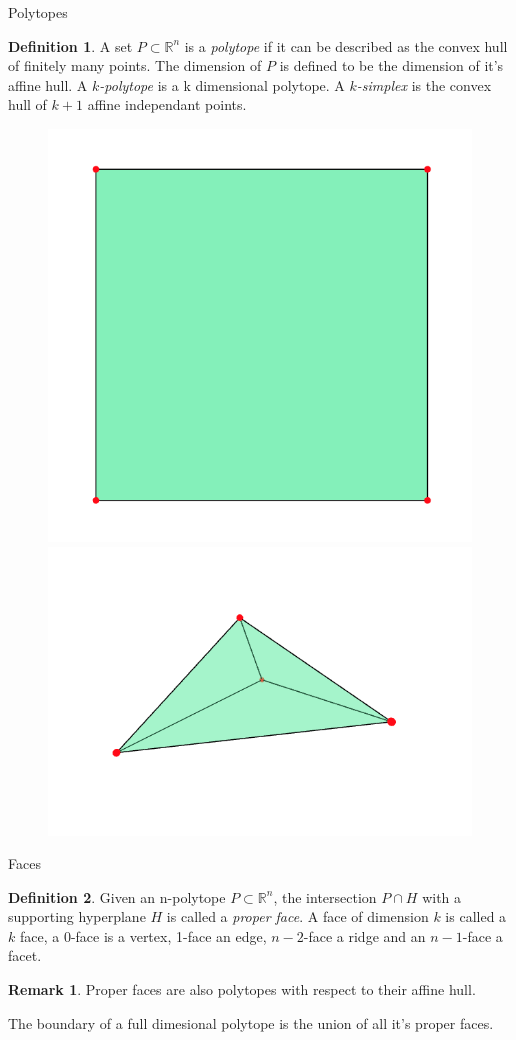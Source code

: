 \documentclass[9pt]{beamer}
\theoremstyle{definition}
\newtheorem{remark}{Remark}
\newtheorem{defn}{Definition}
\begin{document}
\begin{frame}[fragile]{Polytopes}
  \begin{defn}
    A set $P \subset \mathbb{R}^n$ is a \emph{polytope} if it can be described
    as the convex hull of finitely many points. The dimension of $P$ is
    defined to be the dimension of it's affine hull. A \emph{$k$-polytope} is a
    k dimensional polytope. A \emph{$k$-simplex} is the convex hull of $k + 1$
    affine independant points.
  \end{defn}

  \begin{figure}
    \includegraphics[width=.30\textwidth, height=0.4\textheight]{images/square}
    \includegraphics[width=.30\textwidth, height=0.4\textheight]{images/simplex}
  \end{figure}

\end{frame}


\begin{frame}[fragile]{Faces}
  \begin{defn}
    Given an n-polytope $P \subset \mathbb{R}^n$, the intersection $P \cap H$
    with a supporting hyperplane $H$ is called a \emph{proper face}. A face of
    dimension $k$ is called a $k$ face, a 0-face is a vertex, 1-face an edge,
    $n-2$-face a ridge and an $n-1$-face a facet.
  \end{defn}
  \begin{remark}
    Proper faces are also polytopes with respect to their affine hull.
  \end{remark}
  \begin{theorem}
    The boundary of a full dimesional polytope is the union of all it's
    proper faces.
  \end{theorem}

\end{frame}
\end{document}
